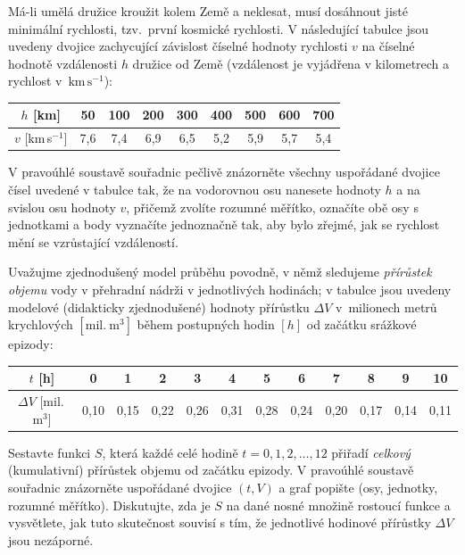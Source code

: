 \documentclass[12pt,a4paper]{article}
\begin{document}
\begin{exercise}
    Má-li umělá družice kroužit kolem Země a neklesat, musí dosáhnout jisté minimální rychlosti, tzv.\ první kosmické rychlosti. V následující tabulce jsou uvedeny dvojice zachycující závislost číselné hodnoty rychlosti \(v\) na číselné hodnotě vzdálenosti \(h\) družice od Země (vzdálenost je vyjádřena v kilometrech a rychlost v~\(\mathrm{km\,s^{-1}}\)):

    \medskip
    \centering
    \begin{tabular}{c|cccccccc}
        \(h\) [km]       & 50 & 100 & 200 & 300 & 400 & 500 & 600 & 700 \\
        \hline
        \(v\) [km\,s\(^{-1}\)] & 7{,}6 & 7{,}4 & 6{,}9 & 6{,}5 & 5{,}2 & 5{,}9 & 5{,}7 & 5{,}4
    \end{tabular}
    \medskip

    V pravoúhlé soustavě souřadnic pečlivě znázorněte všechny uspořádané dvojice čísel uvedené v tabulce tak, že na vodorovnou osu nanesete hodnoty \(h\) a na svislou osu hodnoty \(v\), přičemž zvolíte rozumné měřítko, označíte obě osy s jednotkami a body vyznačíte jednoznačně tak, aby bylo zřejmé, jak se rychlost mění se vzrůstající vzdáleností.
\end{exercise}


\begin{exercise}
    Uvažujme zjednodušený model průběhu povodně, v němž sledujeme \emph{přírůstek objemu} vody v přehradní nádrži v jednotlivých hodinách; v tabulce jsou uvedeny modelové (didakticky zjednodušené) hodnoty přírůstku \(\Delta V\) v~milionech metrů krychlových \([\mathrm{mil.\ m^3}]\) během postupných hodin \([h]\) od začátku srážkové epizody:

    \medskip
    \centering
    \begin{tabular}{c|ccccccccccc}
        \(t\) [h]          & 0 & 1 & 2 & 3 & 4 & 5 & 6 & 7 & 8 & 9 & 10\\
        \hline
        \(\Delta V\) [mil.\,m\(^3\)] & 0{,}10 & 0{,}15 & 0{,}22 & 0{,}26 & 0{,}31 & 0{,}28 & 0{,}24 & 0{,}20 & 0{,}17 & 0{,}14 & 0{,}11
    \end{tabular}
    \medskip

    \begin{tasks}
        \task Sestavte funkci \(S\), která každé celé hodině \(t=0,1,2,\dots,12\) přiřadí \emph{celkový} (kumulativní) přírůstek objemu od začátku epizody.
        \task V pravoúhlé soustavě souřadnic znázorněte uspořádané dvojice \((t, V)\) a graf popište (osy, jednotky, rozumné měřítko).
        \task Diskutujte, zda je \(S\) na dané nosné množině rostoucí funkce a vysvětlete, jak tuto skutečnost souvisí s tím, že jednotlivé hodinové přírůstky \(\Delta V\) jsou nezáporné.
    \end{tasks}
\end{exercise}
\end{document}
